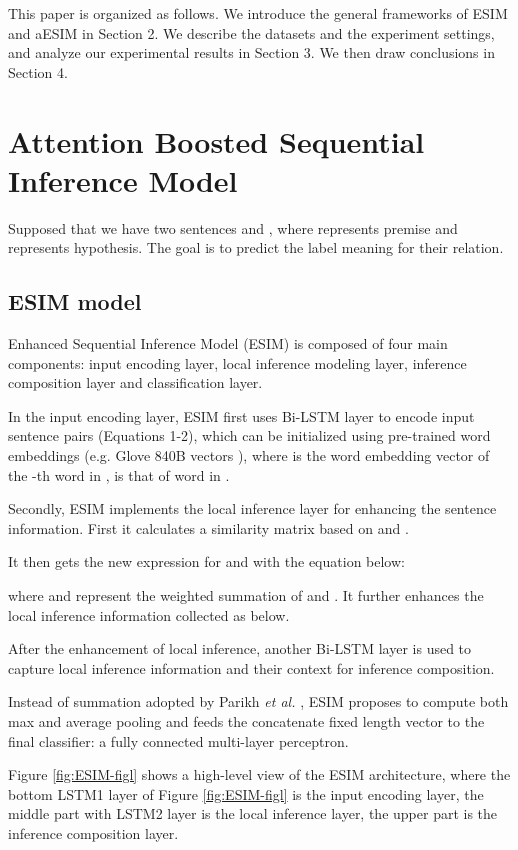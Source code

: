 \documentclass[10pt,sigconf]{acmart}
\begin{document}
This paper is organized as follows. We introduce the general frameworks of ESIM and aESIM in Section 2. We describe the datasets and the experiment settings, and analyze our experimental results in Section 3. We then draw conclusions in Section 4.

\section{Attention Boosted Sequential Inference Model}
Supposed that we have two sentences  and ,
where  represents premise and  represents hypothesis. The goal is to predict the label  meaning for their relation.
\subsection{ESIM model}
Enhanced Sequential Inference Model (ESIM) \cite{cheng2016long} is composed of four main components: input encoding layer, local inference modeling layer, inference composition layer and classification layer.

In the input encoding layer, ESIM first uses Bi-LSTM layer to encode input sentence pairs (Equations 1-2), which can be initialized using pre-trained word embeddings (e.g. Glove 840B vectors \cite{pennington2014glove}), where  is the word embedding vector of the -th word in ,  is that of word in .




Secondly, ESIM implements the local inference layer for enhancing the sentence information. First it calculates a similarity matrix  based on  and .

It then gets the new expression for  and  with the equation below:


where  and   represent the weighted summation of    and . It further enhances the local inference information collected as below.



After the enhancement of local inference, another Bi-LSTM layer is used to capture local inference information and their context for inference composition.

Instead of summation adopted by Parikh {\it et al.} \cite{parikh2016decomposable}, ESIM proposes to compute both max and average pooling and feeds the concatenate fixed length vector to the final classifier: a fully connected multi-layer perceptron.

Figure \ref{fig:ESIM-figl} shows a high-level view of the ESIM architecture, where the bottom LSTM1 layer of Figure \ref{fig:ESIM-figl} is the input encoding layer, the middle part with LSTM2 layer is the local inference layer, the upper part is the inference composition layer.
\end{document}
